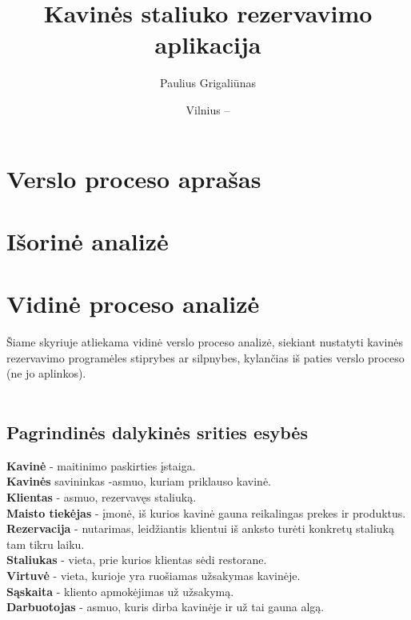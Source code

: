 \documentclass{VUMIFPSkursinis}
\title{Kavinės staliuko rezervavimo aplikacija}
\author{Paulius Grigaliūnas}
\date{Vilnius – \the\year}
\begin{document}
\maketitle
\cleardoublepage{}
\setcounter{page}{2}



\noindent


\tableofcontents

\noindent

\section{Verslo proceso aprašas}

\section{Išorinė analizė}

\section{Vidinė proceso analizė}

Šiame skyriuje atliekama vidinė verslo proceso analizė, siekiant nustatyti kavinės rezervavimo programėles stiprybes ar silpnybes, kylančias iš paties verslo proceso (ne jo aplinkos).\\\\

\subsection{Pagrindinės dalykinės srities esybės}
\noindent \textbf{Kavinė} - maitinimo paskirties įstaiga.\\
\textbf{Kavinės} savininkas -asmuo, kuriam priklauso kavinė.\\
\textbf{Klientas} - asmuo, rezervavęs staliuką. \\
\textbf{Maisto tiekėjas} - įmonė, iš kurios kavinė gauna reikalingas prekes ir produktus. \\
\textbf{Rezervacija} - nutarimas, leidžiantis klientui iš anksto turėti konkretų staliuką tam tikru laiku. \\
\textbf{Staliukas} - vieta, prie kurios klientas sėdi restorane.\\
\textbf{Virtuvė} - vieta, kurioje yra ruošiamas užsakymas kavinėje.\\
\textbf{Sąskaita} - kliento apmokėjimas už užsakymą.\\
\textbf{Darbuotojas} - asmuo, kuris dirba kavinėje ir už tai gauna algą.\\
\end{document}
